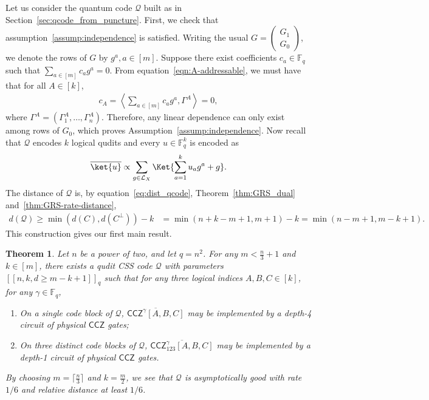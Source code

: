 \documentclass[11pt]{article}
\newtheorem{theorem}{Theorem}[section]
\theoremstyle{definition}
\renewcommand{\ge}{\geqslant}
\newcommand{\CCZ}{\mathsf{CCZ}}
\newcommand{\cL}{\mathcal{L}}
\newcommand{\qcode}{\mathcal{Q}}
\newcommand{\FF}{\mathbb{F}}
\newcommand*{\ol}{\overline}
\begin{document}
Let us consider the quantum code $\qcode$ built as in Section~\ref{sec:qcode_from_puncture}. 
First, we check that assumption~\ref{assump:independence} is satisfied. 
Writing the usual $G = \begin{pmatrix}
    G_1\\ G_0
\end{pmatrix}$, we denote the rows of $G$ by $g^a, a\in [m]$. 
Suppose there exist coefficients $c_a\in \mathbb{F}_q$ such that 
$\sum_{a\in [m]}c_ag^a = 0.$
From equation~\eqref{eqn:A-addressable}, we must have that for all $A\in [k]$,
\begin{align}
    c_A = \left\langle \sum_{a\in [m]}c_ag^a, \Gamma^A \right\rangle = 0,
\end{align}
where $\Gamma^A = (\Gamma^A_1, \ldots, \Gamma^A_n)$. Therefore, any linear dependence can only exist among rows of $G_0$, which proves Assumption~\ref{assump:independence}.
Now recall that $\qcode$ encodes $k$ logical qudits and every $u\in \FF_q^k$ is encoded as
\begin{align}
    \ol{\ket{u}} \propto \sum_{g\in \cL_X} \Ket{\sum_{a=1}^k u_ag^a + g}. 
\end{align}
The distance of $\qcode$ is, by equation~\eqref{eq:dist_qcode}, Theorem~\ref{thm:GRS_dual} and~\ref{thm:GRS-rate-distance},
\begin{align}
    d(\qcode)
    \ge \min(d(C), d(C^\perp)) - k 
    &= \min(n+k-m+1, m+1) - k
    = \min(n-m+1, m-k+1).
\end{align}
This construction gives our first main result.
\begin{theorem}\label{thm:RS_addressable_CCZ}
    Let $n$ be a power of two, and let $q = n^2$.
    For any $m < \frac{n}{3} + 1$ and $k \in [m]$,
    there exists a qudit CSS code $\qcode$ with parameters
    $[[n, k, d\ge m-k+1]]_q$ such that for any three logical indices $A, B, C\in [k]$, for any $\gamma \in \mathbb{F}_q$,
    \begin{enumerate}[itemsep = 0pt]
        \item On a single code block of $\qcode$, $\ol{\CCZ^\gamma[A, B, C]}$ may be implemented by a depth-4 circuit of physical $\CCZ$ gates;
        \item On three distinct code blocks of $\qcode$, $\ol{\CCZ_{123}^\gamma[A, B, C]}$ may be implemented by a depth-1 circuit of physical $\CCZ$ gates.
    \end{enumerate}
    By choosing $m = \lceil\frac{n}{3}\rceil$ and $k = \frac{m}{2}$, we see that $\qcode$ is asymptotically good with rate $1/6$ and relative distance at least $1/6$.
\end{theorem}
\end{document}
